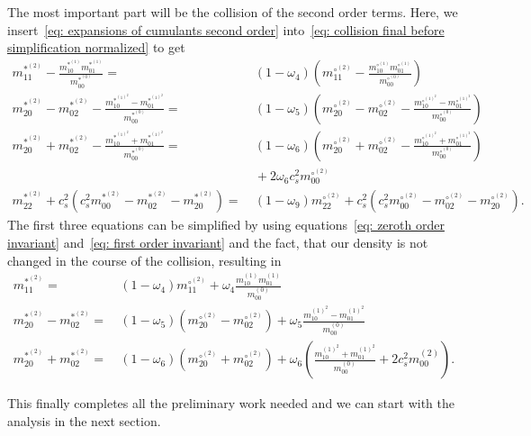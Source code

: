The most important part will be the collision of the second order terms.
Here, we insert~\eqref{eq: expansions of cumulants second order} into~\eqref{eq: collision final before simplification normalized} to get
\begin{align}
  \label{eq: collide moments 11_2 raw}
  m_{11}^{*^{(2)}} - \frac{ m_{10}^{*^{(1)}}m_{01}^{*^{(1)}}}{m_{00}^{*^{(0)}}} =&\ (1-\omega_4)\left(m_{11}^{\circ^{(2)}} - \frac{ m_{10}^{\circ^{(1)}}m_{01}^{\circ^{(1)}}}{m_{00}^{\circ^{(0)}}}\right)
  \\
  \label{eq: collide moments 20m02_2 raw}
  m_{20}^{*^{(2)}}-m_{02}^{*^{(2)}} - \frac{ m_{10}^{*^{{(1)}^2}} - m_{01}^{*^{{(1)}^2}}}{m_{00}^{*^{(0)}}} =&\ (1-\omega_5) \left(m_{20}^{\circ^{(2)}}-m_{02}^{\circ^{(2)}} - \frac{ m_{10}^{\circ^{{(1)}^2}} - m_{01}^{\circ^{{(1)}^2}}}{m_{00}^{\circ^{(0)}}}\right)
  \\
  \label{eq: collide moments 20p02_2 raw}
  m_{20}^{*^{(2)}}+m_{02}^{*^{(2)}} - \frac{ m_{10}^{*^{{(1)}^2}} + m_{01}^{*^{{(1)}^2}}}{m_{00}^{*^{(0)}}}
  =&\ (1-\omega_6)\left(  m_{20}^{\circ^{(2)}}+m_{02}^{\circ^{(2)}} - \frac{ m_{10}^{\circ^{{(1)}^2}} + m_{01}^{\circ^{{(1)}^2}}}{m_{00}^{\circ^{(0)}}}\right)
  \\\nonumber&\ + 2\omega_6 c_s^2 m_{00}^{\circ^{(2)}}
  \\
  \label{eq: collide moments 22_2 raw}
  m_{22}^{*^{(2)}}
  + c_s^2\left(c_s^2 m_{00}^{*^{(2)}}
  - m_{02}^{*^{(2)}}
  - m_{20}^{*^{(2)}} \right)
  =&\ (1-\omega_9)m_{22}^{\circ^{(2)}}
  + c_s^2\left(c_s^2 m_{00}^{\circ^{(2)}}
  - m_{02}^{\circ^{(2)}}
  - m_{20}^{\circ^{(2)}}    \right).
\end{align}
The first three equations can be simplified by using equations~\eqref{eq: zeroth order invariant} and~\eqref{eq: first order invariant} and the fact, that our density is not changed in the course of the collision, resulting in
\begin{align}
  \label{eq: collide moments 11_2}
  m_{11}^{*^{(2)}}  =&\ (1-\omega_4)m_{11}^{\circ^{(2)}} + \omega_4 \frac{ m_{10}^{(1)}m_{01}^{(1)}}{m_{00}^{(0)}}
  \\
  \label{eq: collide moments 20m02_2}
  m_{20}^{*^{(2)}}-m_{02}^{*^{(2)}} =&\ (1-\omega_5) \left(m_{20}^{\circ^{(2)}}-m_{02}^{\circ^{(2)}}\right) + \omega_5 \frac{ m_{10}^{{(1)}^2} - m_{01}^{{(1)}^2}}{m_{00}^{(0)}}
  \\
  \label{eq: collide moments 20p02_2}
  m_{20}^{*^{(2)}}+m_{02}^{*^{(2)}}
  =&\ (1-\omega_6)\left(  m_{20}^{\circ^{(2)}} + m_{02}^{\circ^{(2)}}\right)
  + \omega_6 \left( \frac{ m_{10}^{{(1)}^2} + m_{01}^{{(1)}^2}}{m_{00}^{(0)}}
  + 2 c_s^2 m_{00}^{(2)} \right).
\end{align}


This finally completes all the preliminary work needed and we can start with the analysis in the next section.
